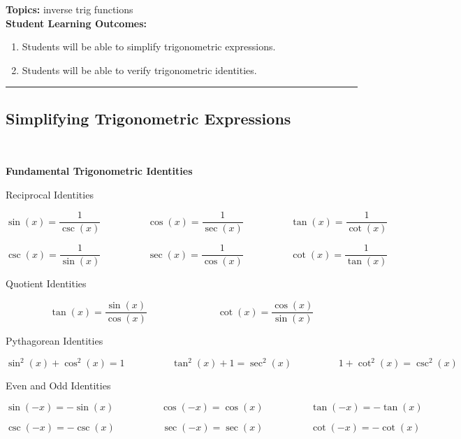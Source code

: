 
\noindent \textbf{Topics:}  inverse trig functions\\

\noindent \textbf{Student Learning Outcomes:}
\begin{enumerate}
\item Students will be able to simplify trigonometric expressions.
\item Students will be able to verify trigonometric identities.

\end{enumerate}

\hrule 

\bigskip

\subsection{Simplifying Trigonometric Expressions} ~

\begin{boxthm}
{\bf Fundamental Trigonometric Identities}

Reciprocal Identities

$$\sin(x) =\frac{1}{\csc(x)} \hspace{2cm}\cos(x) = \frac{1}{\sec(x)}\hspace{2cm}\tan(x) = \frac{1}{\cot(x)}$$

$$\csc(x) =\frac{1}{\sin(x)} \hspace{2cm}\sec(x) = \frac{1}{\cos(x)}\hspace{2cm}\cot(x) = \frac{1}{\tan(x)}$$

Quotient Identities

$$\tan(x) = \frac{\sin(x)}{\cos(x)} \hspace{3cm} \cot(x) = \frac{\cos(x)}{\sin(x)}$$

Pythagorean Identities

$$\sin^2(x) + \cos^2(x)=1 \hspace{2cm}\tan^2(x) +1 = \sec^2(x) \hspace{2cm}1+\cot^2(x) = \csc^2(x)$$

Even and Odd Identities

$$\sin( -x) =-\sin(x)\hspace{2cm}\cos( -x) = \cos(x)\hspace{2cm}\tan(- x) = -\tan(x)$$

$$\csc( -x) =-\csc(x)\hspace{2cm}\sec( -x) = \sec(x)\hspace{2cm}\cot(- x) = -\cot(x)$$

\end{boxthm}


